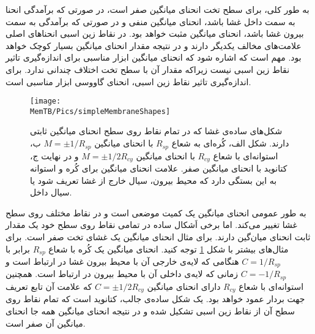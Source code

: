 به طور کلی، برای سطح تخت انحنای میانگین صفر است، در صورتی که برآمدگی انحنا به سمت داخل غشا باشد، انحنای میانگین منفی و در صورتی که برآمدگی به سمت بیرون غشا باشد، انحنای میانگین مثبت خواهد بود. در نقاط زین اسبی انحناهای اصلی علامت‌های مخالف یکدیگر دارند و در نتیجه مقدار انحنای میانگین بسیار کوچک خواهد بود. مهم است که اشاره شود که انحنای میانگین ابزار مناسبی برای اندازه‌گیری تاثیر نقاط زین اسبی نیست زیراکه مقدار آن با سطح تخت اختلاف چندانی ندارد. برای اندازه‌گیری تاثیر نقاط زین اسبی، انحنای گاووسی ابزار مناسبی است.
\begin{figure}[t]
\begin{center}
\texttt{[image: \\MemTB/Pics/simpleMembraneShapes]}
\caption{
شکل‌های ساده‌ی غشا که در تمام نقاط روی سطح انحنای میانگین ثابتی دارند. شکل الف، کُره‌ای به شعاع 
$R_{sp}$
با انحنای میانگین 
$M=\pm 1/R_{sp}$
ب، استوانه‌ای با شعاع 
$R_{cy}$
با انحنای میانگین
$M=\pm 1/2R_{cy}$
و در نهایت ج، کتانوید با انحنای میانگین صفر. علامت انحنای میانگین برای کُره و استوانه به این بستگی دارد که محیط بیرون، سیال خارج از غشا تعریف شود یا سیال داخل.
}
\label{fig:simpleMembraneShapes}
\end{center}
\end{figure}
به طور عمومی انحنای میانگین یک کمیت موضعی است و در نقاط مختلف روی سطح غشا تغییر می‌کند. اما برخی اَشکال ساده در تمامی نقاط روی سطح خود یک مقدار ثابت انحنای میان‌گین دارند. برای مثال انحنای میانگین یک غشای تخت صفر است. برای مثال‌های بیشتر با شکل 
\ref{fig:simpleMembraneShapes}
توجه کنید. انحنای میانگین یک کُره با شعاع
$R_{sp}$
برابر با 
$C=1/R_{sp}$
هنگامی که لایه‌ی خارجی آن با محیط بیرون غشا در ارتباط است و 
$C=-1/R_{sp}$
زمانی که لایه‌ی داخلی آن با محیط بیرون در ارتباط است. همچنین استوانه‌‌ای با شعاع 
$R_{cy}$
دارای انحنای میانگین
$C=\pm1/2R_{cy}$
که علامت آن تابع تعریف جهت بردار عمود خواهد بود. یک شکل ساده‌ی جالب، کتانوید 
 است که تمام نقاط روی سطح آن از نقاط زین اسبی تشکیل شده و در نتیجه انحنای میانگین همه جا انحنای میانگین آن صفر است.





 
 
 
 
 


